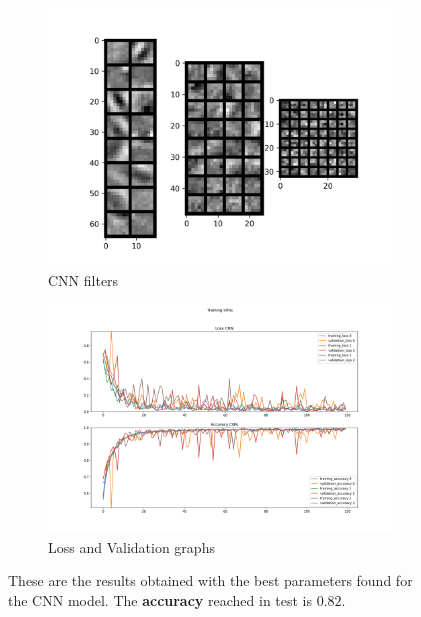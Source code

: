 \documentclass{report}
\begin{document}
\begin{figure}[t!]
  \centering
  \hspace{-2cm}
  \begin{subfigure}[t]{0.49\textwidth}
    \centering
    \includegraphics[width=1.3\textwidth]{3.CNN_500_sample/CNN_filters.png}
    \caption{CNN filters}
    \label{fig:image-set1-sub1}
  \end{subfigure}
  \hspace{-0.5cm}
  \begin{subfigure}[t]{0.49\textwidth}
    \centering
    \includegraphics[width=1.3\textwidth]{3.CNN_500_sample/training_infos.png}
    \caption{Loss and Validation graphs}
    \label{fig:image-set1-sub2}
  \end{subfigure}

  \caption{These are the results obtained with the best parameters found for the CNN model. The \textbf{accuracy} reached in test is $0.82$.}
  \label{fig:image-set1}
\end{figure}
\end{document}
